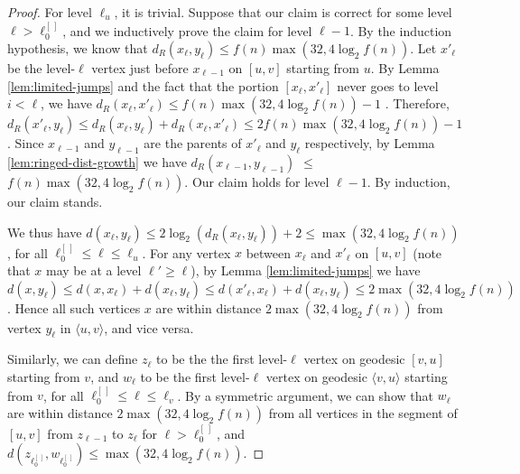 \documentclass[11pt]{article}
\begin{document}
\begin{proof}
For level $\ell_u$, it is trivial. 
Suppose that our claim is correct for some level $\ell > \ell_0^{[\,]}$, 
	and we inductively
	prove the claim for level $\ell-1$.
By the induction hypothesis, 
	we know that $d_R(x_\ell,y_\ell) \leq f(n)\max(32,4\log_2 f(n))$. 
Let $x'_\ell$ be the level-$\ell$ vertex just before $x_{\ell-1}$ on $[u,v]$ 
	starting from $u$. 
By Lemma \ref{lem:limited-jumps} and the fact that the portion $[x_\ell,x'_\ell]$ 
	never goes to level $i < \ell$, we have
	$d_R(x_\ell,x'_\ell) \leq f(n)\max(32,4\log_2 f(n))-1$ . 
Therefore, $d_R(x'_\ell,y_\ell) \leq d_R(x_\ell,y_\ell) + d_R(x_\ell,x'_\ell) \leq 2f(n)\max(32,4\log_2 f(n))-1$.
Since $x_{\ell-1}$ and $y_{\ell-1}$ are 
	the parents of $x'_\ell$ and $y_\ell$ respectively,
	by Lemma \ref{lem:ringed-dist-growth} we have
	$d_R(x_{\ell-1},y_{\ell-1})$ $\leq $ $f(n)\max(32,4\log_2 f(n))$. 
Our claim holds for level $\ell - 1$. By induction, our claim stands. 


We thus have $d(x_{\ell},y_{\ell}) \leq 2\log_2(d_R(x_{\ell},y_{\ell})) + 
	2 \leq \max(32,4\log_2 f(n))$, for all $\ell_0^{[\,]} \le \ell \le \ell_u$. 
For any vertex $x$ between $x_\ell$ and $x'_{\ell}$ on $[u,v]$ (note
	that $x$ may be at a level $\ell'\ge \ell$),
	by Lemma \ref{lem:limited-jumps} we have
	$d(x,y_\ell) \le d(x,x_{\ell}) + d(x_{\ell},y_{\ell}) \le
	d(x'_{\ell},x_{\ell}) + d(x_{\ell},y_{\ell}) \le 2\max(32,4\log_2 f(n))$.
Hence all such vertices $x$ are within distance $2\max(32,4\log_2 f(n))$
	from vertex $y_\ell$ in $\langle u,v\rangle$, and vice versa.

Similarly, we can define $z_\ell$ to be the the first level-$\ell$ vertex on 
	geodesic $[v,u]$ starting from $v$, and  $w_\ell$ to be the first 
	level-$\ell$ vertex
	on geodesic $\langle v,u\rangle$ starting from $v$, for
	all $\ell_0^{[\,]} \le \ell \le \ell_v$.
By a symmetric argument, we can show that $w_\ell$ are within 
	distance $2\max(32,4\log_2 f(n))$ from all vertices in 
	the segment of $[u,v]$ from $z_{\ell-1}$ to $z_{\ell}$ for 
	$\ell > \ell_0^{[\,]}$, and $d(z_{\ell_0^{[\,]}}, w_{\ell_0^{[\,]}}) \le
	\max(32,4\log_2 f(n))$.


\end{proof}
\end{document}
